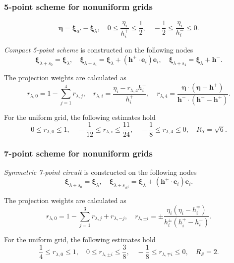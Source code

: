 \documentclass[mathserif]{beamer} %
\newcommand{\bxi}{\boldsymbol{\xi}}
\newcommand{\bh}{\boldsymbol{h}}
\newcommand{\be}{\boldsymbol{e}}
\begin{document}
\begin{frame}
    \frametitle{5-point scheme for nonuniform grids}
    \begin{equation}\label{eq:eta_definition}
        \boldsymbol{\eta} = \bxi_{\alpha'} - \bxi_{\lambda}, \quad
        0 \leq \frac{\eta_i}{h^+_i} \leq \frac12, \quad
        -\frac12 \leq \frac{\eta_i}{h^-_i} \leq 0.
    \end{equation}

    \emph{Compact 5-point scheme} is constructed on the following nodes
    \begin{equation}\label{eq:stencil_nodes_5}
        \bxi_{\lambda+s_0} = \bxi_{\lambda}, \quad
        \bxi_{\lambda+s_i} = \bxi_{\lambda} + (\bh^+\cdot \be_i)\be_i, \quad
        \bxi_{\lambda+s_4} = \bxi_{\lambda} + \bh^-.
    \end{equation}

    The projection weights are calculated as
    \begin{equation}\label{eq:stencil_weights_5}
        r_{\lambda,0} = 1 - \sum_{j=1}^4 r_{\lambda,j}, \quad
        r_{\lambda,i} = \frac{\eta_i - r_{\lambda,4}h^-_i}{h^+_i}, \quad
        r_{\lambda,4} = \frac{\boldsymbol{\eta}\cdot(\boldsymbol{\eta} - \bh^+)}
            {\bh^-\cdot(\bh^- - \bh^+)}.
    \end{equation}
    \vspace{-20pt}

    For the uniform grid, the following estimates hold
    \begin{equation}\label{eq:weights_ranges_5}
        0 \leq r_{\lambda,0} \leq 1, \quad
        -\frac1{12} \leq r_{\lambda,i} \leq \frac{11}{24}, \quad
        -\frac18 \leq r_{\lambda,4} \leq 0, \quad
        R_\mathcal{S} = \sqrt{6}.
    \end{equation}
\end{frame}

\begin{frame}
    \frametitle{7-point scheme for nonuniform grids}
    \emph{Symmetric 7-point circuit} is constructed on the following nodes
    \begin{equation}\label{eq:stencil_nodes_7}
        \bxi_{\lambda+s_0} = \bxi_{\lambda}, \quad
        \bxi_{\lambda+s_{\pm i}} = \bxi_{\lambda} + (\bh^\pm\cdot \be_i)\be_i.
    \end{equation}

    The projection weights are calculated as
    \begin{equation}\label{eq:stencil_weights_7}
        r_{\lambda,0} = 1 - \sum_{j=1}^3 r_{\lambda,j} + r_{\lambda,-j}, \quad
        r_{\lambda,\pm i} = \pm\frac{\eta_i(\eta_i - h^\mp_i)}{h^\pm_i(h^+_i-h^-_i)}.
    \end{equation}

    For the uniform grid, the following estimates hold
    \begin{equation}\label{eq:weights_ranges_7}
        \frac14 \leq r_{\lambda,0} \leq 1, \quad
        0 \leq r_{\lambda,\pm i} \leq \frac38, \quad
        -\frac18 \leq r_{\lambda,\mp i} \leq 0, \quad
        R_\mathcal{S} = 2.
    \end{equation}
\end{frame}
\end{document}
